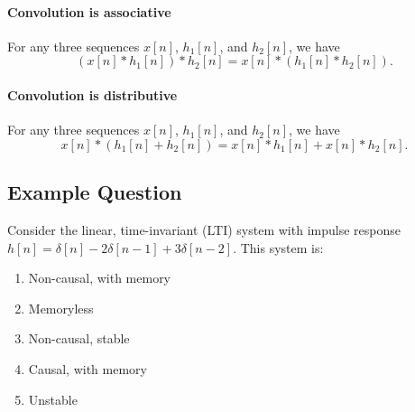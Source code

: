 \paragraph{Convolution is associative} For any three sequences $x[n]$, $h_1[n]$, and $h_2[n]$, we have
\[
    (x[n] * h_1[n]) * h_2[n] = x[n] * (h_1[n] * h_2[n]).
\]

\paragraph{Convolution is distributive} For any three sequences $x[n]$, $h_1[n]$, and $h_2[n]$, we have
\[
    x[n] * (h_1[n] + h_2[n]) = x[n] * h_1[n] + x[n] * h_2[n].
\]


\subsection{Example Question}
\begin{q}{}
Consider the linear, time-invariant (LTI) system with impulse response $h[n] = \delta[n] - 2\delta[n-1] + 3\delta[n-2]$. This system is:
\begin{enumerate}[label=(\alph*)]
    \item Non-causal, with memory
    \item Memoryless
    \item Non-causal, stable
    \item Causal, with memory
    \item Unstable
\end{enumerate}
\end{q}
